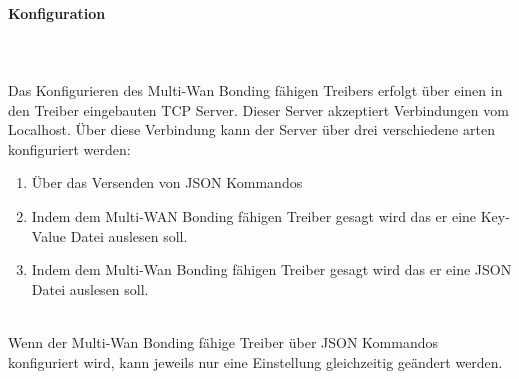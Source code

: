 \paragraph{Konfiguration}
\ \\\\
Das Konfigurieren des Multi-Wan Bonding fähigen Treibers erfolgt über einen in den Treiber eingebauten TCP Server. Dieser Server akzeptiert Verbindungen vom Localhost. Über diese Verbindung kann der Server über drei verschiedene arten konfiguriert werden:
\\
\begin{enumerate}
    \item Über das Versenden von JSON Kommandos
    \item Indem dem Multi-WAN Bonding fähigen Treiber gesagt wird das er eine Key-Value Datei auslesen soll.
    \item Indem dem Multi-Wan Bonding fähigen Treiber gesagt wird das er eine JSON Datei auslesen soll.
\end{enumerate}
\ \\
Wenn der Multi-Wan Bonding fähige Treiber über JSON Kommandos konfiguriert wird, kann jeweils nur eine Einstellung gleichzeitig geändert werden.

\newpage

